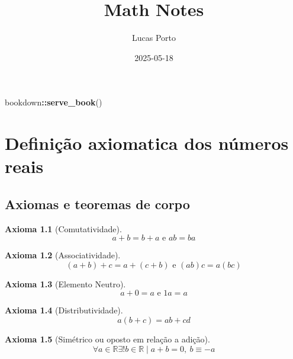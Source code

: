 \documentclass[
]{book}
\title{Math Notes}
\author{Lucas Porto}
\date{2025-05-18}
\newenvironment{Shaded}{\begin{snugshade}}{\end{snugshade}}
\newcommand{\FunctionTok}[1]{\textcolor[rgb]{0.13,0.29,0.53}{\textbf{#1}}}
\newcommand{\NormalTok}[1]{#1}
\newcommand{\SpecialCharTok}[1]{\textcolor[rgb]{0.81,0.36,0.00}{\textbf{#1}}}
\newtheorem{proposition}{Axioma}[chapter]
\theoremstyle{definition}
\theoremstyle{definition}
\theoremstyle{definition}
\theoremstyle{definition}
\theoremstyle{remark}
\begin{document}
\maketitle

{
\setcounter{tocdepth}{1}
\tableofcontents
}
\begin{Shaded}
\begin{Highlighting}[]
\NormalTok{bookdown}\SpecialCharTok{::}\FunctionTok{serve\_book}\NormalTok{()}
\end{Highlighting}
\end{Shaded}

\chapter{Definição axiomatica dos números reais}\label{definiuxe7uxe3o-axiomatica-dos-nuxfameros-reais}

\section{Axiomas e teoremas de corpo}\label{axiomas-e-teoremas-de-corpo}

\begin{proposition}[Comutatividade]
\protect\hypertarget{prp:ircomutativa}{}\label{prp:ircomutativa}\[
a + b = b + a \text{ e } ab = ba
\]
\end{proposition}

\begin{proposition}[Associatividade]
\protect\hypertarget{prp:irassociativa}{}\label{prp:irassociativa}\[
(a + b) + c = a + (c + b) \text{ e } (ab)c = a(bc)
\]
\end{proposition}

\begin{proposition}[Elemento Neutro]
\protect\hypertarget{prp:irneutro}{}\label{prp:irneutro}\[
a + 0 = a \text{ e } 1a = a
\]
\end{proposition}

\begin{proposition}[Distributividade]
\protect\hypertarget{prp:irdistributiva}{}\label{prp:irdistributiva}\[
a (b + c) = ab + cd
\]
\end{proposition}

\begin{proposition}[Simétrico ou oposto em relação a adição]
\protect\hypertarget{prp:irsimetrico}{}\label{prp:irsimetrico}\[
\forall a \in \mathbb{R} \exists! b \in \mathbb{R} \mid a + b = 0,\ b \equiv -a
\]
\end{proposition}
\end{document}
